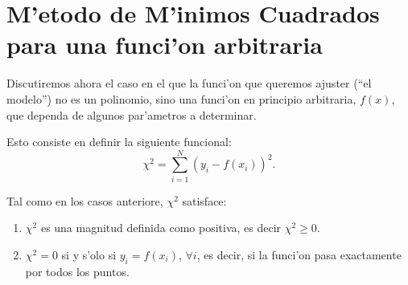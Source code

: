\documentclass[letterpaper,11pt]{report}
\begin{document}
\section{M'etodo de M'inimos Cuadrados para una funci'on arbitraria}
Discutiremos ahora el caso en el que la funci'on que queremos ajuster (``el modelo'') no es un polinomio, sino una funci'on en principio arbitraria, $f(x)$, que dependa de algunos par'ametros a determinar.
%
%

Esto consiste en definir la siguiente funcional: 
\begin{equation}
\chi^2=\sum_{i=1}^N\left(y_i-f(x_i)\right)^2.
\end{equation}

Tal como en los casos anteriore, $\chi^2$ satisface:
\begin{enumerate}
\item $\chi^2$ es una magnitud definida como positiva, es decir $\chi^2\geq 0$.
\item $\chi^2 = 0$ si y s'olo si $y_i = f(x_i)$, $\forall i$, es decir, si la funci'on pasa exactamente por todos los puntos.
\end{enumerate}

\end{document}
